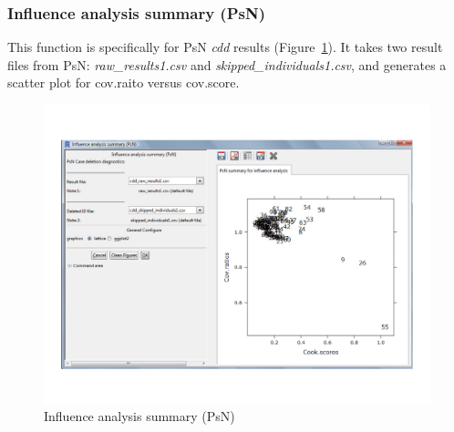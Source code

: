 \documentclass[a4paper]{article}
\begin{document}
\subsubsection{Influence analysis summary (PsN)}
This function is specifically for PsN \textit{cdd} results (Figure~\ref{infPsN}). It takes two result files from PsN: \textit{raw\_results1.csv} and \textit{skipped\_individuals1.csv}, and generates a scatter plot for cov.raito versus cov.score.
\begin{figure}[h!tb] \centering
\includegraphics[scale=0.6]{infPsN.pdf}
\caption{Influence analysis summary (PsN)}
\label{infPsN}
\end{figure}
\end{document}

